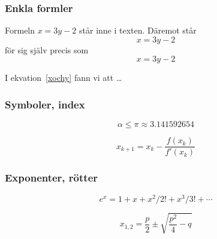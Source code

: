 \begin{frame}[fragile,t]
  \frametitle{Enkla formler}
  \vspace{2em}

  \begin{exlatex}
Formeln $x=3y-2$ står inne i texten. Däremot står
\begin{displaymath}
  x=3y-2
\end{displaymath}
för sig själv precis som
\begin{equation}
  x=3y-2
  \label{xochy}
\end{equation}

I ekvation~\ref{xochy} fann
vi att \ldots
  \end{exlatex}
\end{frame}

\begin{frame}[fragile,t]
  \frametitle{Symboler, index}
  \vspace{2em}

  \begin{exlatex}
\begin{displaymath}
  \alpha \leq \pi \approx 3.141592654
\end{displaymath}
  \end{exlatex}

  \vspace{1cm}

  \begin{exlatex}
\begin{displaymath}
  x_{k+1} =
  x_{k} -
  \frac{f(x_{k})}{f'(x_{k})}
\end{displaymath}
  \end{exlatex}
\end{frame}

\begin{frame}[fragile,t]
  \frametitle{Exponenter, rötter}
  \vspace{2em}

  \begin{exlatex}
\begin{displaymath}
  e^x = 1+x+x^2/2!+x^3/3!+\cdots
\end{displaymath}
  \end{exlatex}

  \vspace{1cm}

  \begin{exlatex}
\begin{displaymath}
  x_{1,2}=\frac{p}{2}\pm
  \sqrt{\frac{p^2}{4}-q}
\end{displaymath}
  \end{exlatex}

\end{frame}



